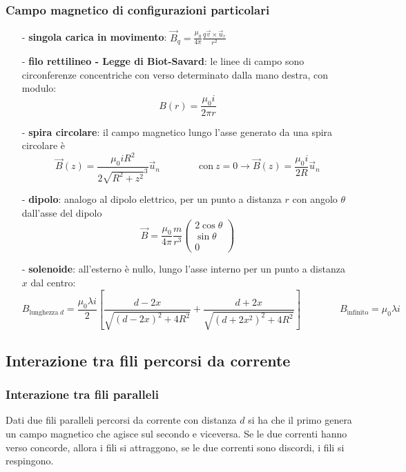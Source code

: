 \documentclass[a4paper]{article}
\newcommand\ur{\vec{u}_r}
\newcommand\un{\vec{u}_n}
\begin{document}
\subsubsection*{Campo magnetico di configurazioni particolari}
\begin{itemize}[topsep=3pt, itemsep=0pt]
	\item[-] \textbf{singola carica in movimento}: \(\displaystyle \vec{B}_q = \frac{\mu_0}{4 \pi} \frac{q \vec{v} \times \ur}{r^2}\)
	\item[-] \textbf{filo rettilineo - Legge di Biot-Savard}: le linee di campo sono circonferenze concentriche con verso
	determinato dalla mano destra, con modulo: \[B(r) = \frac{\mu_0 i}{2 \pi r}\]
	\item[-] \textbf{spira circolare}: il campo magnetico lungo l'asse generato da una spira circolare è
	\[\vec{B}(z) = \frac{\mu_0 i R^2}{2 \sqrt{R^2 + z^2}^3} \un \qquad\qquad \text{con}\ z = 0 \rightarrow \vec{B}(z) = \frac{\mu_0 i}{2R} \un\]
	\item[-] \textbf{dipolo}: analogo al dipolo elettrico, per un punto a distanza \(r\) con angolo \(\theta\)
	dall'asse del dipolo
	\[\vec{B} = \frac{\mu_0}{4 \pi} \frac{m}{r^3} \left(\begin{matrix} 2 \cos \theta \\ \sin \theta \\ 0 \end{matrix}\right)\]
	\item[-] \textbf{solenoide}: all'esterno è nullo, lungo l'asse interno per un punto a distanza \(x\) dal centro:
	\[B_{\text{lunghezza} \; d} = \frac{\mu_0 \lambda i}{2} \left[ \frac{d-2x}{\sqrt{(d-2x)^2+4R^2}} + \frac{d+2x}{\sqrt{(d+2x^2)^2 + 4R^2}} \right]\qquad \qquad B_\text{infinito} = \mu_0 \lambda i\]
\end{itemize}

\newpage

\subsection{Interazione tra fili percorsi da corrente}
\subsubsection*{Interazione tra fili paralleli}
Dati due fili paralleli percorsi da corrente con distanza \(d\) si ha che il primo genera un campo magnetico che agisce sul
secondo e viceversa. Se le due correnti hanno verso concorde, allora i fili si attraggono, se le due correnti sono discordi,
i fili si respingono.
\end{document}
